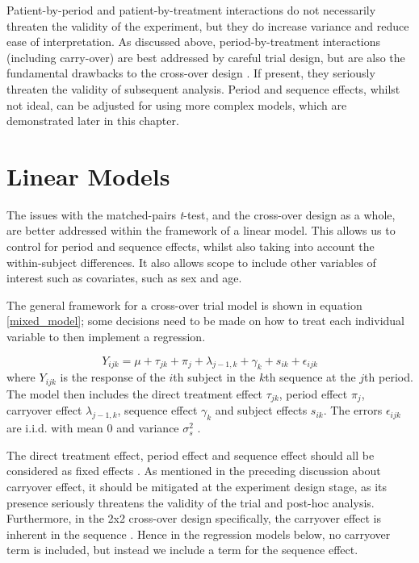 \documentclass[12pt, TexShade, letterpaper]{report}
\begin{document}
Patient-by-period and patient-by-treatment interactions do not necessarily threaten the validity of the experiment, but they do increase variance and reduce ease of interpretation. As discussed above, period-by-treatment interactions (including carry-over) are best addressed by careful trial design, but are also the fundamental drawbacks to the cross-over design \cite{senn2002crossover}. If present, they seriously threaten the validity of subsequent analysis. Period and sequence effects, whilst not ideal, can be adjusted for using more complex models, which are demonstrated later in this chapter.

\section{Linear Models}
The issues with the matched-pairs \textit{t}-test, and the cross-over design as a whole, are better addressed within the framework of a linear model. This allows us to control for period and sequence effects, whilst also taking into account the within-subject differences. It also allows scope to include other variables of interest such as covariates, such as sex and age.

The general framework for a cross-over trial model is shown in equation \ref{mixed_model}; some decisions need to be made on how to treat each individual variable to then implement a regression.

\begin{equation}
    Y_{ijk} = \mu + \tau_{jk} + \pi_j + \lambda_{j-1,k} + \gamma_k + s_{ik} + \epsilon_{ijk}
    \label{mixed_model}
\end{equation}
where $Y_{ijk}$ is the response of the $i$th subject in the $k$th sequence at the $j$th period. The model then includes the direct treatment effect $\tau_{jk}$, period effect $\pi_j$, carryover effect $\lambda_{j-1,k}$, sequence effect $\gamma_k$ and subject effects $s_{ik}$. The errors $\epsilon_{ijk}$ are i.i.d. with mean 0 and variance $\sigma^2_s$ \cite{lim2021considerations}.

The direct treatment effect, period effect and sequence effect should all be considered as fixed effects \cite{lim2021considerations}. As mentioned in the preceding discussion about carryover effect, it should be mitigated at the experiment design stage, as its presence seriously threatens the validity of the trial and post-hoc analysis. Furthermore, in the 2x2 cross-over design specifically, the carryover effect is inherent in the sequence \cite{lim2021considerations}. Hence in the regression models below, no carryover term is included, but instead we include a term for the sequence effect.
\end{document}
